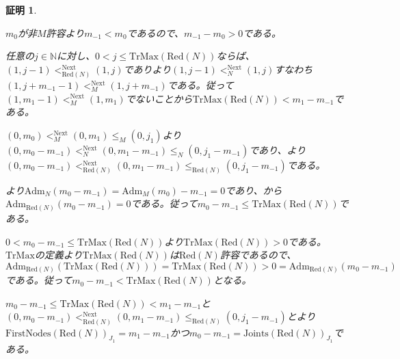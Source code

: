 \documentclass[dvipdfmx,uplatex]{jsarticle}
\theoremstyle{customnonumberbreakfortheorem}
\theoremstyle{customnonumberbreakforproof}
\newtheorem{hideableproof}{証明}
\begin{document}
\begin{hideableproof}
	\begin{indented}
		\item \(m_0\)が非\(M\)許容より\(m_{-1} < m_0\)であるので、\(m_{-1}-m_0 > 0\)である。
		\item 任意の\(j \in \mathbb{N}\)に対し、\(0 < j \leq \textrm{TrMax}(\textrm{Red}(N))\)ならば、\((1,j-1) <_{\textrm{Red}(N)}^{\textrm{Next}} (1,j)\)でありより\((1,j-1) <_{N}^{\textrm{Next}} (1,j)\)すなわち\((1,j+m_{-1}-1) <_M^{\textrm{Next}} (1,j+m_{-1})\)である。従って\((1,m_1-1) <_M^{\textrm{Next}} (1,m_1)\)でないことから\(\textrm{TrMax}(\textrm{Red}(N)) < m_1-m_{-1}\)である。
		\item \((0,m_0) <_M^{\textrm{Next}} (0,m_1) \leq_M (0,j_1)\)より\((0,m_0-m_{-1}) <_N^{\textrm{Next}} (0,m_1-m_{-1}) \leq_N (0,j_1-m_{-1})\)であり、より\((0,m_0-m_{-1}) <_{\textrm{Red}(N)}^{\textrm{Next}} (0,m_1-m_{-1}) \leq_{\textrm{Red}(N)} (0,j_1-m_{-1})\)である。
		\item {}より\(\textrm{Adm}_N(m_0-m_{-1}) = \textrm{Adm}_M(m_0)-m_{-1} = 0\)であり、から\(\textrm{Adm}_{\textrm{Red}(N)}(m_0-m_{-1}) = 0\)である。従って\(m_0-m_{-1} \leq \textrm{TrMax}(\textrm{Red}(N))\)である。
		\item \(0 < m_0-m_{-1} \leq \textrm{TrMax}(\textrm{Red}(N))\)より\(\textrm{TrMax}(\textrm{Red}(N)) > 0\)である。\(\textrm{TrMax}\)の定義より\(\textrm{TrMax}(\textrm{Red}(N))\)は\(\textrm{Red}(N)\)許容であるので、\(\textrm{Adm}_{\textrm{Red}(N)}(\textrm{TrMax}(\textrm{Red}(N))) = \textrm{TrMax}(\textrm{Red}(N)) > 0 = \textrm{Adm}_{\textrm{Red}(N)}(m_0-m_{-1})\)である。従って\(m_0-m_{-1} < \textrm{TrMax}(\textrm{Red}(N))\)となる。
		\item \(m_0-m_{-1} \leq \textrm{TrMax}(\textrm{Red}(N)) < m_1-m_{-1}\)と\((0,m_0-m_{-1}) <_{\textrm{Red}(N)}^{\textrm{Next}} (0,m_1-m_{-1}) \leq_{\textrm{Red}(N)} (0,j_1-m_{-1})\)とより\(\textrm{FirstNodes}(\textrm{Red}(N))_{J_1} = m_1-m_{-1}\)かつ\(m_0-m_{-1} = \textrm{Joints}(\textrm{Red}(N))_{J_1}\)である。
	\end{indented}
\end{hideableproof}
\end{document}
